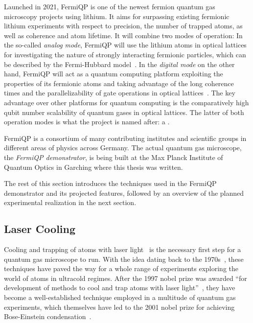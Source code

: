 Launched in 2021, FermiQP is one of the newest fermion quantum gas microscopy projects using lithium. It aims for surpassing existing fermionic lithium experiments with respect to precision, the number of trapped atoms, as well as coherence and atom lifetime. It will combine two modes of operation: In the so-called \textit{analog mode}, FermiQP will use the lithium atoms in optical lattices for investigating the nature of strongly interacting fermionic particles, which can be described by the Fermi-Hubbard model~\cite{hubbard_electron_1963, esslinger_fermi-hubbard_2010}. In the \textit{digital mode} on the other hand, FermiQP will act as a quantum computing platform exploiting the properties of its fermionic atoms and taking advantage of the long coherence times and the parallelizability of gate operations in optical lattices~\cite{zhang_functional_2022}. The key advantage over other platforms for quantum computing is the comparatively high qubit number scalability of quantum gases in optical lattices. The latter of both operation modes is what the project is named after: a .

FermiQP is a consortium of many contributing institutes and scientific groups in different areas of physics across Germany. The actual quantum gas microscope, the \textit{FermiQP demonstrator}, is being built at the Max Planck Institute of Quantum Optics in Garching where this thesis was written.

The rest of this section introduces the techniques used in the FermiQP demonstrator and its projected features, followed by an overview of the planned experimental realization in the next section.

\subsection*{Laser Cooling}\label{ch:laser_cooling}
Cooling and trapping of atoms with laser light~\cite{foot_atomic_2005,metcalf_laser_1999} is the necessary first step for a quantum gas microscope to run. With the idea dating back to the 1970s~\cite{hansch_cooling_1975}, these techniques have paved the way for a whole range of experiments exploring the world of atoms in ultracold regimes. After the 1997 nobel prize was awarded ``for development of methods to cool and trap atoms with laser light''~\cite{noauthor_nobel_nodate}, they have become a well-established technique employed in a multitude of quantum gas experiments, which themselves have led to the 2001 nobel prize for achieving Bose-Einstein condensation~\cite{noauthor_nobel_nodate-1}.

